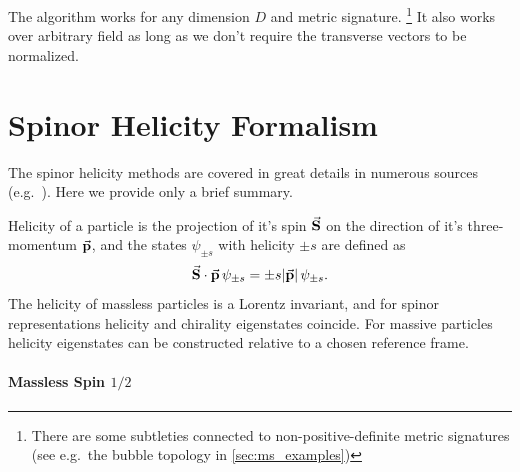 The algorithm works for any dimension $D$ and metric signature.%
\footnote{There are some subtleties connected to non-positive-definite metric signatures (see e.g.\ the bubble topology in \cref{sec:ms_examples})}
It also works over arbitrary field as long as we don't require the transverse vectors to be normalized.


\chapter{Spinor Helicity Formalism}
\label{chap:4dspinhel}

The spinor helicity methods are covered in great details in numerous sources (e.g.\ \cite{Maitre:2007jq,Kuczmarski:2014ara,Weinzierl:2016bus,DittmaierWeyl,Cohen:2010mi}).
Here we provide only a brief summary.

Helicity of a particle is the projection of it's spin $\va{S}$ on the direction of it's
three-momentum $\va{p}$, and the states $\psi_{\pm s}$ with helicity $\pm s$ are defined as
\begin{equation} \label{eq:helicity_def}
  \sp(\va{S},\va{p}) \, \psi_{\pm s} = \pm s \abs{\va{p}}\, \psi_{\pm s}.
\end{equation}
The helicity of massless particles is a Lorentz invariant, and for spinor representations helicity and chirality eigenstates
coincide. 
For massive particles helicity eigenstates can be constructed relative to a chosen reference frame.


\subsubsection{Massless Spin $1/2$}

